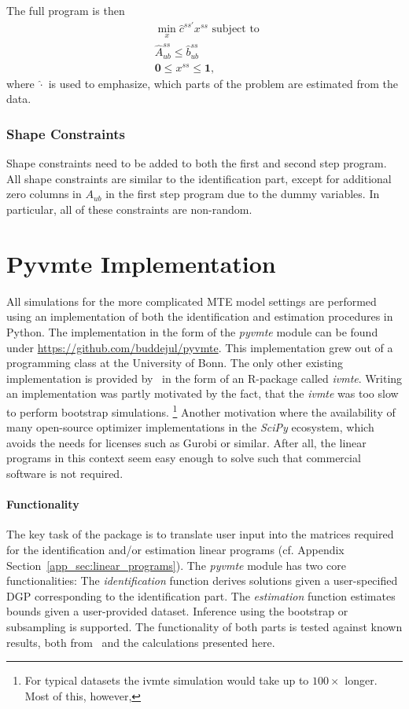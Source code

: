 \documentclass[12pt,a4paper,english]{article} %
\numberwithin{equation}{section}
\theoremstyle{definition}
\theoremstyle{remark}
\theoremstyle{plain}
\begin{document}
The full program is then
\begin{align}
  & \min_x \hat{c}^{ss'}x^{ss} \text{ subject to }\\
  & \hat{A}_{ub}^{ss} \leq \hat{b}_{ub}^{ss} \\
  & \mathbf{0} \leq x^{ss} \leq \mathbf{1},
\end{align}
where $\hat{\cdot}$ is used to emphasize, which parts of the problem are estimated from the data.

\subsubsection{Shape Constraints}
Shape constraints need to be added to both the first and second step program.
All shape constraints are similar to the identification part, except for additional zero columns in $A_{ub}$ in the first step program due to the dummy variables.
In particular, all of these constraints are non-random.

\clearpage
\newpage

\section{Pyvmte Implementation}
All simulations for the more complicated MTE model settings are performed using an implementation of both the identification and estimation procedures in Python.
The implementation in the form of the \textit{pyvmte} module can be found under \url{https://github.com/buddejul/pyvmte}.
This implementation grew out of a programming class at the University of Bonn.
The only other existing implementation is provided by~\cite{shea2023ivmte} in the form of an R-package called \textit{ivmte}.
Writing an implementation was partly motivated by the fact, that the \textit{ivmte} was too slow to perform bootstrap simulations.
\footnote{For typical datasets the ivmte simulation would take up to $100\times$ longer.
Most of this, however, }
Another motivation where the availability of many open-source optimizer implementations in the \textit{SciPy} ecosystem, which avoids the needs for licenses such as Gurobi or similar.
After all, the linear programs in this context seem easy enough to solve such that commercial software is not required.


\paragraph{Functionality}
The key task of the package is to translate user input into the matrices required for the identification and/or estimation linear programs (cf. Appendix Section~\ref{app_sec:linear_programs}).
The \textit{pyvmte} module has two core functionalities:
The \textit{identification} function derives solutions given a user-specified DGP corresponding to the identification part.
The \textit{estimation} function estimates bounds given a user-provided dataset. Inference using the bootstrap or subsampling is supported.
The functionality of both parts is tested against known results, both from~\cite{mogstad2018using} and the calculations presented here.
\end{document}
